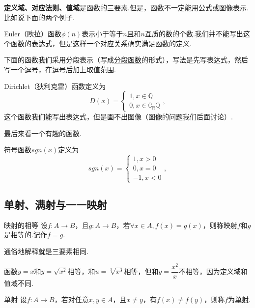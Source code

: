 \documentclass[lang=cn,math=cm,chinesefont=nofont,11pt,scheme=chinese,twocol]{elegantbook}
\begin{document}
\begin{spacing}{1.5}
  \textbf{定义域、对应法则、值域}是函数的三要素.但是，函数不一定能用公式或图像表示.比如说下面的两个例子.
\end{spacing}

\begin{example}
  Euler（欧拉）函数$\phi (n)$表示小于等于$n$且和$n$互质的数的个数.我们并不能写出这个函数的表达式，但是这样一个对应关系确实满足函数的定义.
\end{example}

下面的函数我们采用分段表示（写成\underline{分段函数}的形式），写法是先写表达式，然后写一个逗号，在逗号后加上取值范围.

\begin{example}
  Dirichlet（狄利克雷）函数定义为
  $$D(x)=
  \begin{cases}
    1,x\in\mathbb{Q}
    \\0,x\in\complement_{\mathbb{R}}\mathbb{Q}
  \end{cases},$$
  这个函数我们能写出表达式，但是画不出图像（图像的问题我们后面讨论）.
\end{example}

最后来看一个有趣的函数.

\begin{example}
  符号函数$sgn(x)$定义为
  $$sgn(x)=
  \begin{cases}
    1,x>0
    \\0,x=0
    \\-1,x<0
  \end{cases},$$
\end{example}

\subsection{单射、满射与一一映射}

\begin{definition}{映射的相等}
  设$f:A\rightarrow B$，且$g:A\rightarrow B$，若$\forall x\in A,f(x)=g(x)$，则称映射$f$和$g$是\underline{相等}的.记作$f=g$.
\end{definition}

通俗地解释就是三要素相同.

\begin{example}
  函数$y=x$和$y=\sqrt{x^2}$相等，和$u=\sqrt[3]{x^3}$相等，但和$y=\dfrac{x^2}{x}$不相等，因为定义域和值域不同.
\end{example}

\begin{definition}{单射}
  设$f:A\rightarrow B$，若对任意$x,y\in A$，且$x\neq y$，有$f(x)\neq f(y)$，则称$f$为\underline{单射}.
\end{definition}
\end{document}
